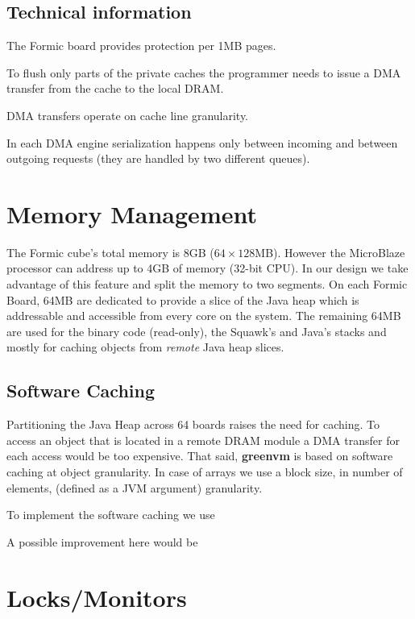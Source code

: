 \documentclass[
a4paper,
12pt,
]{report}
\newcommand{\gvm}{{\fontfamily{fco}\selectfont\textbf{\color{g}green\color{v}vm}}\xspace}
\newcommand{\mblaze}{MicroBlaze\texttrademark\xspace}
\newcommand{\java}{Java\texttrademark\xspace}
\begin{document}
\subsection{Technical information}
The Formic board provides protection per 1MB pages.

To flush only parts of the private caches the programmer needs to
issue a DMA transfer from the cache to the local DRAM.

DMA transfers operate on cache line granularity.

In each DMA engine serialization happens only between incoming and
between outgoing requests (they are handled by two different queues).

\section{Memory Management}
The Formic cube's total memory is 8GB ($64\times128$MB). However the
\mblaze processor can address up to 4GB of memory (32-bit CPU). In our
design we take advantage of this feature and split the memory to two
segments. On each Formic Board, 64MB are dedicated to provide a slice
of the \java heap which is addressable and accessible from every core
on the system. The remaining 64MB are used for the binary code
(read-only), the Squawk's and \java's stacks and mostly for caching
objects from \textit{remote} \java heap slices.


\subsection{Software Caching}

Partitioning the \java Heap across 64 boards raises the need for
caching. To access an object that is located in a remote DRAM module a
DMA transfer for each access would be too expensive. That said, \gvm
is based on software caching at object granularity. In case of arrays
we use a block size, in number of elements, (defined as a JVM
argument) granularity.

To implement the software caching we use

A possible improvement here would be

\section{Locks/Monitors}
\end{document}
